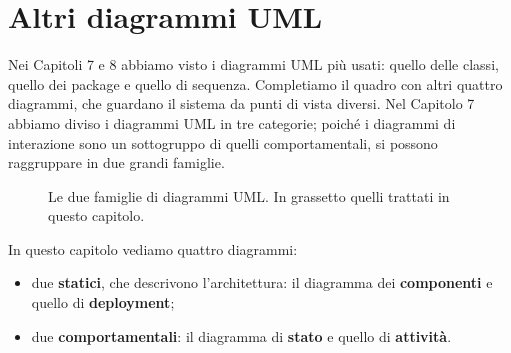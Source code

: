 \chapter{Altri diagrammi UML}

Nei Capitoli 7 e 8 abbiamo visto i diagrammi UML più usati: quello delle classi, quello dei package e quello di sequenza.
Completiamo il quadro con altri quattro diagrammi, che guardano il sistema da punti di vista diversi. Nel Capitolo 7 abbiamo
diviso i diagrammi UML in tre categorie; poiché i diagrammi di interazione sono un sottogruppo di quelli comportamentali, si
possono raggruppare in due grandi famiglie.

\begin{figure}[H]
\centering
{}
\caption{Le due famiglie di diagrammi UML. In grassetto quelli trattati in questo capitolo.}
\end{figure}

In questo capitolo vediamo quattro diagrammi:
\begin{itemize}
  \item due \textbf{statici}, che descrivono l'architettura: il diagramma dei \textbf{componenti} e quello di \textbf{deployment};
  \item due \textbf{comportamentali}: il diagramma di \textbf{stato} e quello di \textbf{attività}.
\end{itemize}

